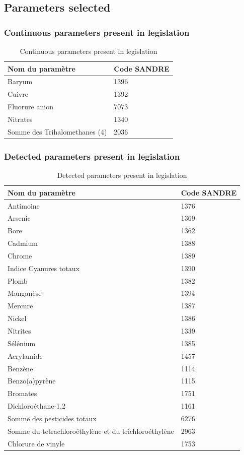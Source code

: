 \documentclass{article}
\begin{document}
\subsection{Parameters selected}
\subsubsection*{Continuous parameters present in legislation}
\begin{table}[H]
\centering
\begin{tabular}{|l|l|}
\hline
\textbf{Nom du paramètre} & \textbf{Code SANDRE} \\
\hline
Baryum & 1396 \\
Cuivre & 1392 \\
Fluorure anion & 7073 \\
Nitrates & 1340 \\
Somme des Trihalomethanes (4) & 2036 \\
\hline
\end{tabular}
\caption{Continuous parameters present in legislation}
\end{table}

\subsubsection*{Detected parameters present in legislation}
\begin{table}[H]
\centering
\begin{tabular}{|l|l|}
\hline
\textbf{Nom du paramètre} & \textbf{Code SANDRE} \\
\hline
Antimoine & 1376 \\
Arsenic & 1369 \\
Bore & 1362 \\
Cadmium & 1388 \\
Chrome & 1389 \\
Indice Cyanures totaux & 1390 \\
Plomb & 1382 \\
Manganèse & 1394 \\
Mercure & 1387 \\
Nickel & 1386 \\
Nitrites & 1339 \\
Sélénium & 1385 \\
Acrylamide & 1457 \\
Benzène & 1114 \\
Benzo(a)pyrène & 1115 \\
Bromates & 1751 \\
Dichloroéthane-1,2 & 1161 \\
Somme des pesticides totaux & 6276 \\
Somme du tetrachloroéthylène et du trichloroéthylène & 2963 \\
Chlorure de vinyle & 1753 \\
\hline
\end{tabular}
\caption{Detected parameters present in legislation}
\end{table}
\end{document}

